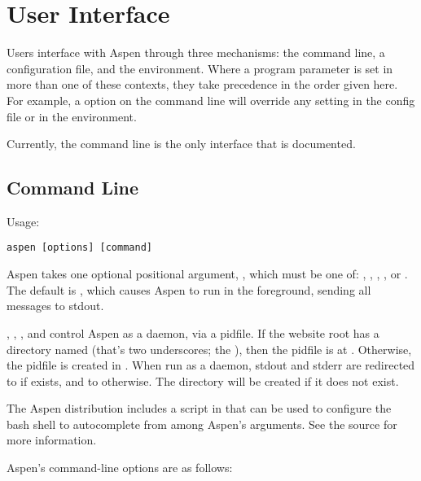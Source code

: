 \chapter{User Interface \label{interface}}

Users interface with Aspen through three mechanisms: the command line, a
configuration file, and the environment. Where a program parameter is set in
more than one of these contexts, they take precedence in the order given here.
For example, a  option on the command line will override any
 setting in the config file or in the environment.

Currently, the command line is the only interface that is documented.


\section{Command Line \label{command-line}}

Usage:

\begin{verbatim}
aspen [options] [command]
\end{verbatim}

Aspen takes one optional positional argument, , which must be one
of: , , , , or .
The default is , which causes Aspen to run in the foreground,
sending all messages to stdout.

, , , and  control Aspen as a
daemon, via a pidfile. If the website root has a directory named \file{__}
(that's two underscores; the ), then the pidfile is at
. Otherwise, the pidfile is created in . When
run as a daemon, stdout and stderr are redirected to  if
\file{__} exists, and to  otherwise. The  directory
will be created if it does not exist.

The Aspen distribution includes a script in 
that can be used to configure the bash shell to autocomplete from among Aspen's
arguments. See the source for more information.

Aspen's command-line options are as follows:

